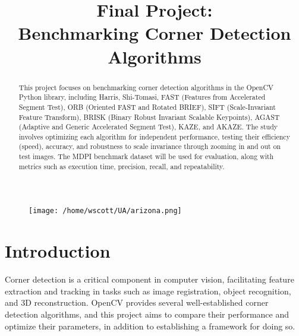 \documentclass[journal]{IEEEtran}
\begin{document}
\title{Final Project:\\Benchmarking Corner Detection Algorithms}

\author{
}

\maketitle

\thispagestyle{plain}  %
\pagestyle{plain} 

\begin{figure}[h]
    \centering
    \begin{minipage}{\textwidth}
        \centering
    \texttt{[image: /home/wscott/UA/arizona.png]}
    \end{minipage}
\end{figure}

\onecolumn
\twocolumn
\pagebreak

\begin{abstract}
This project focuses on benchmarking corner detection algorithms in the OpenCV Python library, including Harris, Shi-Tomasi, FAST (Features from Accelerated Segment Test), ORB (Oriented FAST and Rotated BRIEF), SIFT (Scale-Invariant Feature Transform), BRISK (Binary Robust Invariant Scalable Keypoints), AGAST (Adaptive and Generic Accelerated Segment Test), KAZE, and AKAZE. The study involves optimizing each algorithm for independent performance, testing their efficiency (speed), accuracy, and robustness to scale invariance through zooming in and out on test images. The MDPI benchmark dataset will be used for evaluation, along with metrics such as execution time, precision, recall, and repeatability.
\end{abstract}

\section{Introduction}
Corner detection is a critical component in computer vision, facilitating feature extraction and tracking in tasks such as image registration, object recognition, and 3D reconstruction. OpenCV provides several well-established corner detection algorithms, and this project aims to compare their performance and optimize their parameters, in addition to establishing a framework for doing so.
\end{document}
